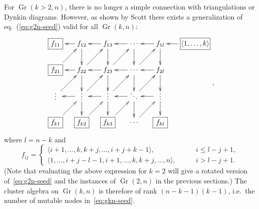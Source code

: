 \documentclass[11pt]{article}
\DeclareMathOperator{\Gr}{Gr}
\def\ket#1{\langle #1 \rangle}
\begin{document}
For $\Gr(k>2,n)$, there is no longer a simple connection with triangulations or Dynkin diagrams. However, as shown by Scott \cite{1088.22009} there exists a generalization of eq.~(\ref{eq:g2n-seed}) valid for all $\Gr(k,n)$:
\begin{equation}\label{eq:gkn-seed}
\begin{gathered}
\begin{xy} 0;<-.5pt,0pt>:<0pt,-.5pt>::
	(-100,0) *+{\framebox[10ex]{$\ket{1,\ldots,k}$}} ="-1",
	(0,0) *+{f_{1l}} ="0",
	(75,0) *+{\color{white} f_{00}} ="1",
	(150,0) *+{f_{13}} ="2",
	(225,0) *+{f_{12}} ="3",
	(300,0) *+{\framebox[5ex]{$f_{11}$}} ="4",
	(0,75) *+{f_{2l}} ="5",
	(75,75) *+{\color{white} f_{00}} ="6",
	(150,75) *+{f_{23}} ="7",
	(225,75) *+{f_{22}} ="8",
	(300,75) *+{\framebox[5ex]{$f_{21}$}} ="9",
	(0,150) *+{\color{white} f_{00}} ="10",
	(75,150) *+{\color{white} f_{00}} ="11",
	(150,150) *+{\color{white} f_{00}} ="12",
	(225,150) *+{\color{white} f_{00}} ="13",
	(300,150) *+{\color{white} f_{00}} ="14",
	(0,225) *+{\framebox[5ex]{$f_{kl}$}} ="15",
	(75,225) *+{\color{white} f_{00}} ="16",
	(150,225) *+{\framebox[5ex]{$f_{k3}$}} ="17",
	(225,225) *+{\framebox[5ex]{$f_{k2}$}} ="18",
	(300,225) *+{\framebox[5ex]{$f_{k1}$}} ="19",
	(75,0) *+{\cdots} ="01",
	(75,75) *+{\cdots} ="06",
	(0,144) *+{\vdots} ="010",
	(75,144) *+{\ddots} ="011",
	(150,144) *+{\vdots} ="012",
	(225,144) *+{\vdots} ="013",
	(300,144) *+{\vdots} ="014",
	(75,225) *+{\cdots} ="016",
	"-1", {\ar"0"},
	"0", {\ar"1"},
	"0", {\ar"5"},
	"6", {\ar"0"},
	"1", {\ar"2"},
	"2", {\ar"3"},
	"2", {\ar"7"},
	"8", {\ar"2"},
	"3", {\ar"4"},
	"3", {\ar"8"},
	"9", {\ar"3"},
	"5", {\ar"6"},
	"6", {\ar"7"},
	"7", {\ar"8"},
	"8", {\ar"9"},
	"13", {\ar"7"},
	"7", {\ar"12"},
	"8", {\ar"13"},
	"5", {\ar"10"},
	"14", {\ar"8"},
	"10", {\ar"15"},
	"12", {\ar"17"},
	"19", {\ar"13"},
	"18", {\ar"12"},
	"13", {\ar"18"},
	"17", {\ar"11"},
	"16", {\ar"10"},
	"13", {\ar"14"},
	"12", {\ar"13"},
	"11", {\ar"12"},
	"10", {\ar"11"},
	"7", {\ar"1"},
	"11", {\ar"5"},
	"12", {\ar"6"},
	"1", {\ar"6"},
	"6", {\ar"11"},
	"11", {\ar"16"},
\end{xy}
\end{gathered} ,
\end{equation}
where $l=n-k$ and 
\begin{equation}
  f_{i j} =
  \begin{cases}
    \langle i+1, \dotsc, k, k+j, \dotsc, i+j+k-1\rangle, \qquad &i \leq l-j+1,\\
    \langle 1, \dotsc, i+j-l-1, i+1, \dotsc, k, k+j, \dotsc, n\rangle, \qquad &i >l-j+1.
  \end{cases}
\end{equation}
(Note that evaluating the above expression for $k=2$ will give a rotated version of~\eqref{eq:g2n-seed} and the instances of $\Gr(2,n)$ in the previous sections.) The cluster algebra on $\Gr(k,n)$ is therefore of rank $(n-k-1)(k-1)$, i.e.~the number of mutable nodes in~\eqref{eq:gkn-seed}. 
\end{document}
